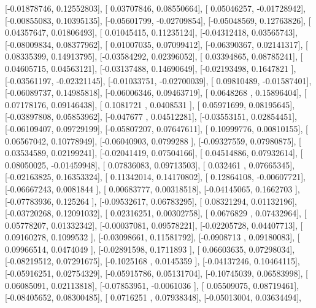 \documentclass{article}
\begin{document}
       [-0.01878746,  0.12552803],
       [ 0.03707846,  0.08550664],
       [ 0.05046257, -0.01728942],
       [-0.00855083,  0.10395135],
       [-0.05601799, -0.02709854],
       [-0.05048569,  0.12763826],
       [ 0.04357647,  0.01806493],
       [ 0.01045415,  0.11235124],
       [-0.04312418,  0.03565743],
       [-0.08009834,  0.08377962],
       [ 0.01007035,  0.07099412],
       [-0.06390367,  0.02141317],
       [ 0.08335399,  0.14913795],
       [-0.03584292,  0.02396052],
       [ 0.03394865,  0.08785241],
       [ 0.04605715,  0.04563121],
       [-0.03137488,  0.14690649],
       [-0.02193498,  0.1647821 ],
       [-0.03561197, -0.02321145],
       [-0.01033751, -0.02700039],
       [ 0.09810489, -0.01587401],
       [-0.06089737,  0.14985818],
       [-0.06006346,  0.09463719],
       [ 0.0648268 ,  0.15896404],
       [ 0.07178176,  0.09146438],
       [ 0.1081721 ,  0.0408531 ],
       [ 0.05971699,  0.08195645],
       [-0.03897808,  0.05853962],
       [-0.047677  ,  0.04512281],
       [-0.03553151,  0.02854451],
       [-0.06109407,  0.09729199],
       [-0.05807207,  0.07647611],
       [ 0.10999776,  0.00810155],
       [ 0.06567042,  0.10778949],
       [-0.06040903,  0.0799288 ],
       [-0.09327559,  0.07980875],
       [ 0.03534589,  0.02199241],
       [-0.02041419,  0.07504166],
       [ 0.04514886,  0.07932614],
       [ 0.08050025, -0.01459948],
       [ 0.07836083,  0.09713503],
       [ 0.032461  ,  0.07665345],
       [-0.02163825,  0.16353324],
       [ 0.11342014,  0.14170802],
       [ 0.12864108, -0.00607721],
       [-0.06667243,  0.0081844 ],
       [ 0.00683777,  0.00318518],
       [-0.04145065,  0.1662703 ],
       [-0.07783936,  0.125264  ],
       [-0.09532617,  0.06783295],
       [ 0.08321294,  0.01132196],
       [-0.03720268,  0.12091032],
       [ 0.02316251,  0.00302758],
       [ 0.0676829 ,  0.07432964],
       [ 0.05778207,  0.01332342],
       [-0.00037081,  0.09578221],
       [-0.02205728,  0.04407713],
       [ 0.09160278,  0.1099532 ],
       [-0.03098661,  0.11581792],
       [-0.0908713 ,  0.09180083],
       [ 0.09966514,  0.0474049 ],
       [-0.02891598,  0.1711893 ],
       [ 0.06603635,  0.07298034],
       [-0.08219512,  0.07291675],
       [-0.1025168 ,  0.0145359 ],
       [-0.04137246,  0.10464115],
       [-0.05916251,  0.02754329],
       [-0.05915786,  0.05131704],
       [-0.10745039,  0.06583998],
       [ 0.06085091,  0.02113818],
       [-0.07853951, -0.0061036 ],
       [ 0.05509075,  0.08719461],
       [-0.08405652,  0.08300485],
       [ 0.0716251 ,  0.07938348],
       [-0.05013004,  0.03634494],
\end{document}
